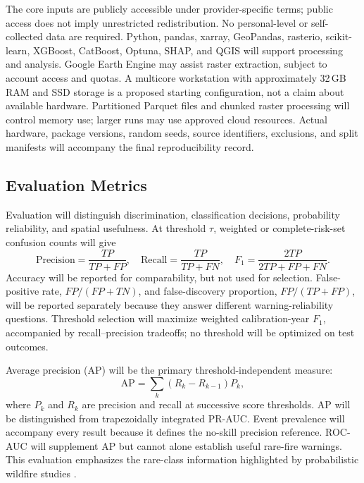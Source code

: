 \documentclass[pdflatex,sn-mathphys-num]{sn-jnl}
\begin{document}
The core inputs are publicly accessible under provider-specific terms; public access does not imply unrestricted redistribution. No personal-level or self-collected data are required. Python, pandas, xarray, GeoPandas, rasterio, scikit-learn, XGBoost, CatBoost, Optuna, SHAP, and QGIS will support processing and analysis. Google Earth Engine may assist raster extraction, subject to account access and quotas. A multicore workstation with approximately 32\,GB RAM and SSD storage is a proposed starting configuration, not a claim about available hardware. Partitioned Parquet files and chunked raster processing will control memory use; larger runs may use approved cloud resources. Actual hardware, package versions, random seeds, source identifiers, exclusions, and split manifests will accompany the final reproducibility record.

\subsection{Evaluation Metrics}

Evaluation will distinguish discrimination, classification decisions, probability reliability, and spatial usefulness. At threshold $\tau$, weighted or complete-risk-set confusion counts will give
\begin{equation}
\mathrm{Precision}=\frac{TP}{TP+FP},\quad
\mathrm{Recall}=\frac{TP}{TP+FN},\quad
F_1=\frac{2TP}{2TP+FP+FN}.
\end{equation}
Accuracy will be reported for comparability, but not used for selection. False-positive rate, $FP/(FP+TN)$, and false-discovery proportion, $FP/(TP+FP)$, will be reported separately because they answer different warning-reliability questions. Threshold selection will maximize weighted calibration-year $F_1$, accompanied by recall--precision tradeoffs; no threshold will be optimized on test outcomes.

Average precision (AP) will be the primary threshold-independent measure:
\begin{equation}
\mathrm{AP}=\sum_k(R_k-R_{k-1})P_k,
\end{equation}
where $P_k$ and $R_k$ are precision and recall at successive score thresholds. AP will be distinguished from trapezoidally integrated PR-AUC. Event prevalence will accompany every result because it defines the no-skill precision reference. ROC-AUC will supplement AP but cannot alone establish useful rare-fire warnings. This evaluation emphasizes the rare-class information highlighted by probabilistic wildfire studies \cite{choi2026burnedarea}.
\end{document}
